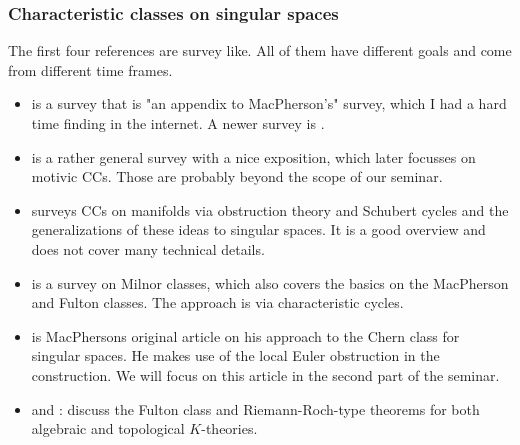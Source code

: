 \documentclass[a4paper]{article}
\begin{document}
\subsubsection*{Characteristic classes on singular spaces}
The first four references are survey like. All of them have different goals and come from 
different time frames.
\begin{itemize}
  \item \cite{Yokura05} is a survey that is "an appendix to MacPherson's" survey, which
	  I had a hard time finding in the internet. A newer survey is \cite{Yokura07}.
  \item \cite{SchuermannYokura07} is a rather general survey with a nice exposition,
	  which later focusses on motivic CCs. Those are probably beyond the scope of
	  our seminar.
  \item \cite{Brasselet00} surveys CCs on manifolds via obstruction theory and Schubert
	  cycles and the generalizations of these ideas to singular spaces. It is a good
	  overview and does not cover many technical details.
  \item \cite{Parusinski06} is a survey on Milnor classes, which also covers the basics on
	  the MacPherson and Fulton classes. The approach is via characteristic cycles.
  \item \cite{MacPherson74} is MacPhersons original article on his approach to the Chern
	  class for singular spaces. He makes use of the local Euler obstruction in the
	  construction. We will focus on this article in the second part of the seminar.
  \item \cite{BaumFultonMacPherson79} and \cite{BaumFultonMacPherson75}: 
    discuss the Fulton class and Riemann-Roch-type theorems for both algebraic 
    and topological $K$-theories.
\end{itemize}


\printbibliography
\end{document}
